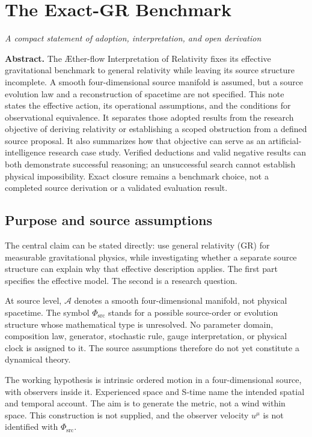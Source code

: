 \documentclass[11pt,oneside]{report}
\newcommand{\Aflow}{\AE{}ther-flow}
\newcommand{\Sub}{\mathcal A}
\newcommand{\PhiSrc}{\Phi_{\mathrm{src}}}
\theoremstyle{remark}
\numberwithin{definition}{chapter}
\numberwithin{proposition}{chapter}
\numberwithin{remark}{chapter}
\newcommand{\ChapterAbstract}[1]{%
  \begingroup
  \setlength{\parindent}{0pt}%
  \small\textbf{Abstract.} #1\par
  \endgroup
  \vspace{0.55\baselineskip}%
}
\begin{document}
\chapter{The Exact-GR Benchmark}
\label{chapter:exact_closure_note}
{\noindent\normalsize\itshape A compact statement of adoption, interpretation, and open derivation\par}\vspace{0.55\baselineskip}
\ChapterAbstract{The \Aflow{} Interpretation of Relativity fixes its effective gravitational benchmark to general relativity while leaving its source structure incomplete. A smooth four-dimensional source manifold is assumed, but a source evolution law and a reconstruction of spacetime are not specified. This note states the effective action, its operational assumptions, and the conditions for observational equivalence. It separates those adopted results from the research objective of deriving relativity or establishing a scoped obstruction from a defined source proposal. It also summarizes how that objective can serve as an artificial-intelligence research case study. Verified deductions and valid negative results can both demonstrate successful reasoning; an unsuccessful search cannot establish physical impossibility. Exact closure remains a benchmark choice, not a completed source derivation or a validated evaluation result.}

\section{Purpose and source assumptions}
The central claim can be stated directly: use general relativity (GR) for measurable gravitational physics, while investigating whether a separate source structure can explain why that effective description applies. The first part specifies the effective model. The second is a research question.

At source level, $\Sub$ denotes a smooth four-dimensional manifold, not physical spacetime. The symbol $\PhiSrc$ stands for a possible source-order or evolution structure whose mathematical type is unresolved. No parameter domain, composition law, generator, stochastic rule, gauge interpretation, or physical clock is assigned to it. The source assumptions therefore do not yet constitute a dynamical theory.

The working hypothesis is intrinsic ordered motion in a four-dimensional source, with observers inside it. Experienced space and S-time name the intended spatial and temporal account. The aim is to generate the metric, not a wind within space. This construction is not supplied, and the observer velocity $u^\mu$ is not identified with $\PhiSrc$.
\end{document}
